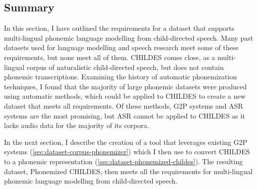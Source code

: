 



\subsection{Summary}
\label{sec:dataset-background-summary}

In this section, I have outlined the requirements for a dataset that supports multi-lingual phonemic language modelling from child-directed speech. Many past datasets used for language modelling and speech research meet some of these requirements, but none meet all of them. CHILDES comes close, as a multi-lingual corpus of naturalistic child-directed speech, but does not contain phonemic transcriptions. Examining the history of automatic phonemization techniques, I found that the majority of large phonemic datasets were produced using automatic methods, which could be applied to CHILDES to create a new dataset that meets all requirements. Of these methods, G2P systems and ASR systems are the most promising, but ASR cannot be applied to CHILDES as it lacks audio data for the majority of its corpora. 

In the next section, I describe the creation of a tool that leverages existing G2P systems (\cref{sec:dataset-corpus-phonemizer}) which I then use to convert CHILDES to a phonemic representation (\cref{sec:dataset-phonemized-childes}). The resulting dataset, Phonemized CHILDES, then meets all the requirements for multi-lingual phonemic language modelling from child-directed speech. 


